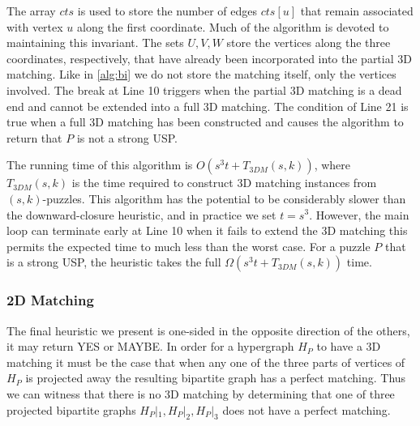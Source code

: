 \documentclass[11pt]{article}
\begin{document}
The array $cts$ is used to store the number of edges $cts[u]$ that
remain associated with vertex $u$ along the first coordinate.  Much of
the algorithm is devoted to maintaining this invariant.  The sets
$U,V,W$ store the vertices along the three coordinates, respectively,
that have already been incorporated into the partial 3D matching.
Like in \autoref{alg:bi} we do not store the matching itself, only the
vertices involved.  The break at Line 10 triggers when the partial 3D
matching is a dead end and cannot be extended into a full 3D matching.
The condition of Line 21 is true when a full 3D matching has been
constructed and causes the algorithm to return that $P$ is not a
strong USP.

The running time of this algorithm is $O(s^3 t + T_{3DM}(s,k))$, where
$T_{3DM}(s,k)$ is the time required to construct 3D matching instances
from $(s,k)$-puzzles.  This algorithm has the potential to be
considerably slower than the downward-closure heuristic, and in
practice we set $t = s^3$.  However, the main loop can terminate early
at Line 10 when it fails to extend the 3D matching this permits the
expected time to much less than the worst case.  For a puzzle $P$ that
is a strong USP, the heuristic takes the full $\Omega(s^3 t +
T_{3DM}(s,k))$ time.





\subsubsection{2D Matching}

The final heuristic we present is one-sided in the opposite direction
of the others, it may return YES or MAYBE.  In order for a hypergraph
$H_P$ to have a 3D matching it must be the case that when any one of
the three parts of vertices of $H_P$ is projected away the resulting
bipartite graph has a perfect matching.  Thus we can witness that
there is no 3D matching by determining that one of three projected
bipartite graphs $H_P|_1, H_P|_2, H_P|_3$ does not have a perfect
matching.
\end{document}
